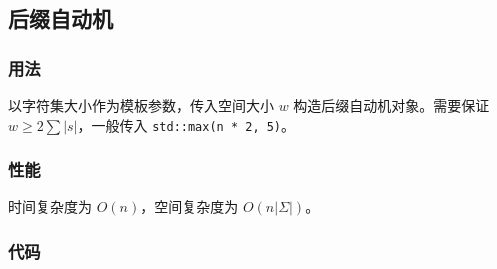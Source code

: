 \subsection{后缀自动机}

\subsubsection{用法}

以字符集大小作为模板参数，传入空间大小 $w$ 构造后缀自动机对象。需要保证 $w \ge 2 \sum |s|$，一般传入 \lstinline{std::max(n * 2, 5)}。

\subsubsection{性能}

时间复杂度为 $O(n)$，空间复杂度为 $O(n |\Sigma|)$。

\subsubsection{代码}


